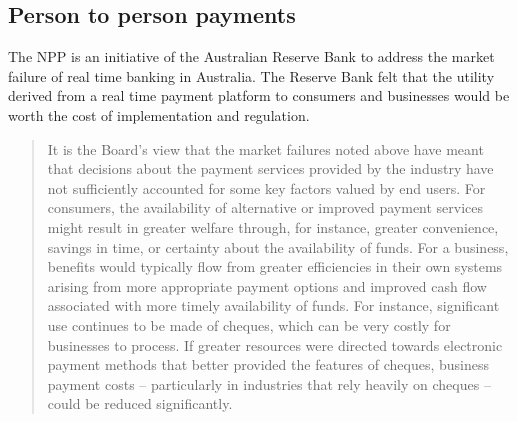 \subsection{Person to person payments}
The NPP is an initiative of the Australian Reserve Bank to address the market failure of real time banking in Australia. The Reserve Bank felt that the utility derived from a real time payment platform to consumers and businesses would be worth the cost of implementation and regulation.

\begin{quotation}
It is the Board's view that the market failures noted above have meant that decisions about the payment
services provided by the industry have not sufficiently accounted for some key factors valued by end users.
For consumers, the availability of alternative or improved payment services might result in greater welfare
through, for instance, greater convenience, savings in time, or certainty about the availability of funds. For
a business, benefits would typically flow from greater efficiencies in their own systems arising from more
appropriate payment options and improved cash flow associated with more timely availability of funds. For
instance, significant use continues to be made of cheques, which can be very costly for businesses to process.
If greater resources were directed towards electronic payment methods that better provided the features of
cheques, business payment costs -- particularly in industries that rely heavily on cheques -- could be reduced
significantly\cite[p3]{RefWorks:283}.
\end{quotation}


